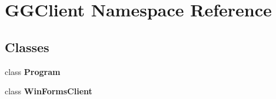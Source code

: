 \section{G\+G\+Client Namespace Reference}
\label{namespace_g_g_client}
\subsection*{Classes}
\begin{DoxyCompactItemize}
\item 
class {\bfseries Program}
\item 
class \textbf{ Win\+Forms\+Client}
\end{DoxyCompactItemize}

